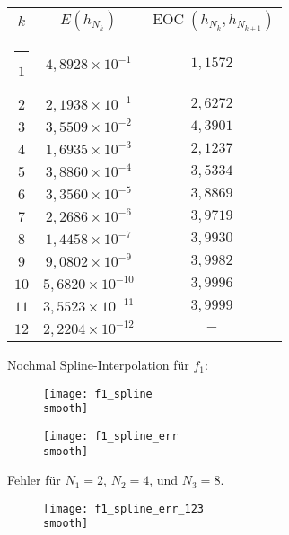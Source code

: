\documentclass[]{scrartcl}
\makeatletter
\newcommand{\thickhline}{%
    \noalign {\ifnum 0=`}\fi \hrule height 1pt
    \futurelet \reserved@a \@xhline
}
\makeatother
\begin{document}
 	\renewcommand{\arraystretch}{1.2}
 	\begin{tabular}{|c|c|c|}\hline
 	$k$  & $E(h_{N_k})$ & $\operatorname{EOC}(h_{N_k},h_{N_{k+1}})$\\\thickhline
 	$1$  & $4,8928\times10^{-1}$ & $1,1572$\\\hline
 	$2$  & $2,1938\times10^{-1}$ & $2,6272$\\\hline
 	$3$  & $3,5509\times10^{-2}$ & $4,3901$\\\hline
 	$4$  & $1,6935\times10^{-3}$ & $2,1237$\\\hline
 	$5$  & $3,8860\times10^{-4}$ & $3,5334$\\\hline
 	$6$  & $3,3560\times10^{-5}$ & $3,8869$\\\hline
 	$7$  & $2,2686\times10^{-6}$ & $3,9719$\\\hline
 	$8$  & $1,4458\times10^{-7}$ & $3,9930$\\\hline
 	$9$  & $9,0802\times10^{-9}$ & $3,9982$\\\hline
 	$10$ & $5,6820\times10^{-10}$ & $3,9996$\\\hline
 	$11$ & $3,5523\times10^{-11}$ & $3,9999$\\\hline
 	$12$ & $2,2204\times10^{-12}$ & $-$\\\hline
 	\end{tabular}
 	
 	Nochmal Spline-Interpolation für $f_1$:
	\begin{figure}[h]
		\centering
		\begin{minipage}{0.5\textwidth}
			\texttt{[image: f1\_spline\\smooth]}
			\caption{}
		\end{minipage}
		\begin{minipage}{0.49\textwidth}
			\texttt{[image: f1\_spline\_err\\smooth]}
			\caption{}
		\end{minipage}
	\end{figure} 
	
	Fehler für $N_1=2$, $N_2=4$, und $N_3=8$.
 	
 	\begin{figure}[H]
 		\centering
		\texttt{[image: f1\_spline\_err\_123\\smooth]}
		\caption{}
 	\end{figure}
 	
\end{document}
